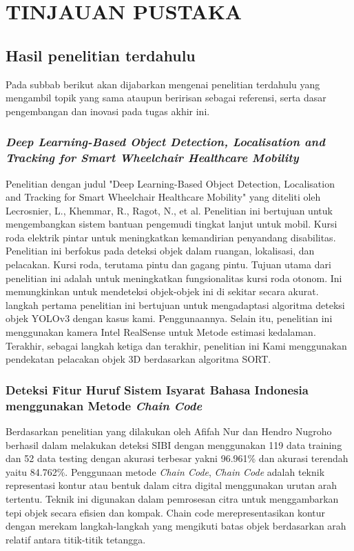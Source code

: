 \chapter{TINJAUAN PUSTAKA}

\section{Hasil penelitian terdahulu}
Pada subbab berikut akan dijabarkan mengenai penelitian terdahulu yang mengambil topik yang sama ataupun beririsan sebagai referensi, serta dasar pengembangan dan inovasi pada tugas akhir ini.
\subsection{\emph{Deep Learning-Based Object Detection, Localisation and Tracking
for Smart Wheelchair Healthcare Mobility}} Penelitian dengan judul "Deep Learning-Based Object Detection, Localisation and Tracking for Smart Wheelchair Healthcare Mobility" yang diteliti oleh Lecrosnier, L., Khemmar, R., Ragot, N., et al.
Penelitian ini bertujuan untuk mengembangkan sistem bantuan pengemudi tingkat lanjut untuk mobil. Kursi roda elektrik pintar untuk meningkatkan kemandirian penyandang disabilitas. Penelitian ini berfokus pada deteksi objek dalam ruangan, lokalisasi, dan pelacakan.
Kursi roda, terutama pintu dan gagang pintu.
Tujuan utama dari penelitian ini adalah untuk meningkatkan fungsionalitas kursi roda otonom. Ini memungkinkan untuk mendeteksi objek-objek ini di sekitar secara akurat. langkah pertama penelitian ini bertujuan untuk mengadaptasi algoritma deteksi objek YOLOv3 dengan kasus kami. Penggunaannya. Selain itu, penelitian ini menggunakan kamera Intel RealSense untuk Metode estimasi kedalaman. Terakhir, sebagai langkah ketiga dan terakhir, penelitian ini Kami menggunakan pendekatan pelacakan objek 3D berdasarkan algoritma SORT. \cite{Lecrosnier2021}

\subsection{Deteksi Fitur Huruf Sistem Isyarat Bahasa Indonesia menggunakan Metode \emph{Chain Code}}
Berdasarkan penelitian yang dilakukan oleh Afifah Nur dan Hendro Nugroho berhasil dalam melakukan deteksi SIBI dengan menggunakan 119 data training dan 52 data testing dengan akurasi terbesar yakni 96.961\% dan akurasi terendah yaitu 84.762\%. Penggunaan metode \emph{Chain Code}, \emph{Chain Code} adalah teknik representasi kontur atau bentuk dalam citra digital menggunakan urutan arah tertentu. Teknik ini digunakan dalam pemrosesan citra untuk menggambarkan tepi objek secara efisien dan kompak. Chain code merepresentasikan kontur dengan merekam langkah-langkah yang mengikuti batas objek berdasarkan arah relatif antara titik-titik tetangga. \cite{Afifah2022}

